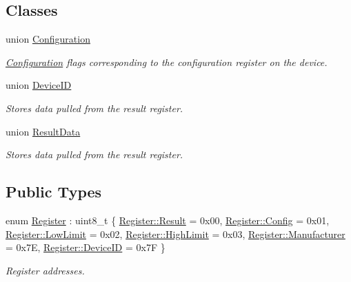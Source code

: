 \subsection*{Classes}
\begin{DoxyCompactItemize}
\item 
union \hyperlink{unioncubesat_1_1OPT3001_1_1Configuration}{Configuration}
\begin{DoxyCompactList}\small\item\em \hyperlink{unioncubesat_1_1OPT3001_1_1Configuration}{Configuration} flags corresponding to the configuration register on the device. \end{DoxyCompactList}\item 
union \hyperlink{unioncubesat_1_1OPT3001_1_1DeviceID}{Device\+ID}
\begin{DoxyCompactList}\small\item\em Stores data pulled from the result register. \end{DoxyCompactList}\item 
union \hyperlink{unioncubesat_1_1OPT3001_1_1ResultData}{Result\+Data}
\begin{DoxyCompactList}\small\item\em Stores data pulled from the result register. \end{DoxyCompactList}\end{DoxyCompactItemize}
\subsection*{Public Types}
\begin{DoxyCompactItemize}
\item 
enum \hyperlink{classcubesat_1_1OPT3001_af8ded2d0275e87105725928dc0485ad7}{Register} \+: uint8\+\_\+t \{ \newline
\hyperlink{classcubesat_1_1OPT3001_af8ded2d0275e87105725928dc0485ad7a8eea62084ca7e541d918e823422bd82e}{Register\+::\+Result} = 0x00, 
\hyperlink{classcubesat_1_1OPT3001_af8ded2d0275e87105725928dc0485ad7afa535ffb25e1fd20341652f9be21e06e}{Register\+::\+Config} = 0x01, 
\hyperlink{classcubesat_1_1OPT3001_af8ded2d0275e87105725928dc0485ad7adc3cf632a3bd74f489cf2c107ed4828b}{Register\+::\+Low\+Limit} = 0x02, 
\hyperlink{classcubesat_1_1OPT3001_af8ded2d0275e87105725928dc0485ad7aad4a6d393859661965ecfede46dcc2af}{Register\+::\+High\+Limit} = 0x03, 
\newline
\hyperlink{classcubesat_1_1OPT3001_af8ded2d0275e87105725928dc0485ad7ac0bd7654d5b278e65f21cf4e9153fdb4}{Register\+::\+Manufacturer} = 0x7E, 
\hyperlink{classcubesat_1_1OPT3001_af8ded2d0275e87105725928dc0485ad7ae1227e600b90b8a261c760fbaaaa5c97}{Register\+::\+Device\+ID} = 0x7F
 \}\begin{DoxyCompactList}\small\item\em Register addresses. \end{DoxyCompactList}
\end{DoxyCompactItemize}
